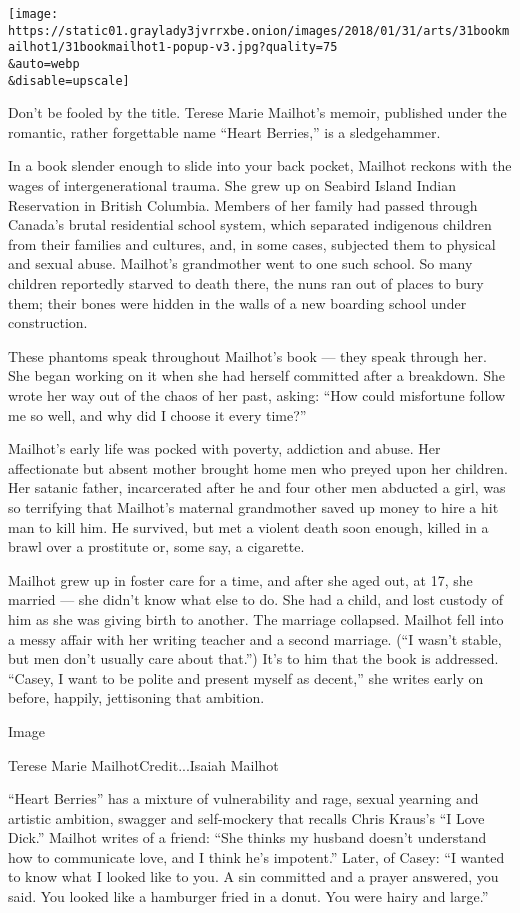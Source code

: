 \texttt{[image: https://static01.graylady3jvrrxbe.onion/images/2018/01/31/arts/31bookmailhot1/31bookmailhot1-popup-v3.jpg?quality=75\\\&auto=webp\\\&disable=upscale]}

Don't be fooled by the title. Terese Marie Mailhot's memoir, published
under the romantic, rather forgettable name ``Heart Berries,'' is a
sledgehammer.

In a book slender enough to slide into your back pocket, Mailhot reckons
with the wages of intergenerational trauma. She grew up on Seabird
Island Indian Reservation in British Columbia. Members of her family had
passed through Canada's brutal residential school system, which
separated indigenous children from their families and cultures, and, in
some cases, subjected them to physical and sexual abuse. Mailhot's
grandmother went to one such school. So many children reportedly starved
to death there, the nuns ran out of places to bury them; their bones
were hidden in the walls of a new boarding school under construction.

These phantoms speak throughout Mailhot's book --- they speak through
her. She began working on it when she had herself committed after a
breakdown. She wrote her way out of the chaos of her past, asking: ``How
could misfortune follow me so well, and why did I choose it every
time?''

Mailhot's early life was pocked with poverty, addiction and abuse. Her
affectionate but absent mother brought home men who preyed upon her
children. Her satanic father, incarcerated after he and four other men
abducted a girl, was so terrifying that Mailhot's maternal grandmother
saved up money to hire a hit man to kill him. He survived, but met a
violent death soon enough, killed in a brawl over a prostitute or, some
say, a cigarette.

Mailhot grew up in foster care for a time, and after she aged out, at
17, she married --- she didn't know what else to do. She had a child,
and lost custody of him as she was giving birth to another. The marriage
collapsed. Mailhot fell into a messy affair with her writing teacher and
a second marriage. (``I wasn't stable, but men don't usually care about
that.'') It's to him that the book is addressed. ``Casey, I want to be
polite and present myself as decent,'' she writes early on before,
happily, jettisoning that ambition.

Image

Terese Marie MailhotCredit...Isaiah Mailhot

``Heart Berries'' has a mixture of vulnerability and rage, sexual
yearning and artistic ambition, swagger and self-mockery that recalls
Chris Kraus's ``I Love Dick.'' Mailhot writes of a friend: ``She thinks
my husband doesn't understand how to communicate love, and I think he's
impotent.'' Later, of Casey: ``I wanted to know what I looked like to
you. A sin committed and a prayer answered, you said. You looked like a
hamburger fried in a donut. You were hairy and large.''

